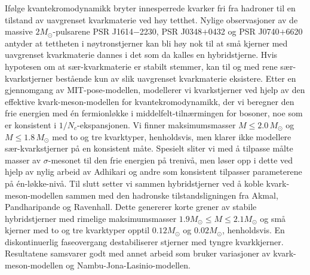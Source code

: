 Ifølge kvantekromodynamikk bryter innesperrede kvarker fri fra hadroner til en tilstand av uavgrenset kvarkmaterie ved høy tetthet.
Nylige observasjoner av de massive $2 M_\odot$-pulsarene PSR J1614$-$2230, PSR J0348$+$0432 og PSR J0740$+$6620
antyder at tettheten i nøytronstjerner kan bli høy nok til at små kjerner med uavgrenset kvarkmaterie
dannes i det som da kalles en hybridstjerne.
Hvis hypotesen om at sær-kvarkmaterie er stabilt stemmer,
kan til og med rene sær-kvarkstjerner bestående kun av slik uavgrenset kvarkmaterie eksistere.
Etter en gjennomgang av MIT-pose-modellen,
modellerer vi kvarkstjerner ved hjelp av den effektive kvark-meson-modellen for kvantekromodynamikk,
der vi beregner den frie energien med én fermionløkke i middelfelt-tilnærmingen for bosoner, %
noe som er konsistent i $1/N_c$-ekspansjonen.
Vi finner maksimumsmasser $M \leq 2.0 \, M_\odot$ og $M \leq 1.8 \, M_\odot$ med
to og tre kvarktyper, henholdsvis,
men klarer ikke modellere sær-kvarkstjerner på en konsistent måte.
Spesielt sliter vi med å tilpasse målte masser av $\sigma$-mesonet til den frie energien på trenivå,
men løser opp i dette ved hjelp av nylig arbeid av Adhikari og andre
som konsistent tilpasser parameterene på én-løkke-nivå.
Til slutt setter vi sammen hybridstjerner ved å koble kvark-meson-modellen
sammen med den hadronske tilstandsligningen fra Akmal, Pandharipande og Ravenhall.
Dette genererer korte grener av stabile hybridstjerner med rimelige maksimumsmasser $1.9 M_\odot \leq M \leq 2.1 M_\odot$
og små kjerner med to og tre kvarktyper opptil $0.12 M_\odot$ og $0.02 M_\odot$, henholdsvis.
En diskontinuerlig faseovergang destabiliserer stjerner med tyngre kvarkkjerner.
Resultatene samsvarer godt med annet arbeid
som bruker variasjoner av kvark-meson-modellen
og Nambu-Jona-Lasinio-modellen.%
\tikzexternaldisable%
%
\tikzexternalenable%
